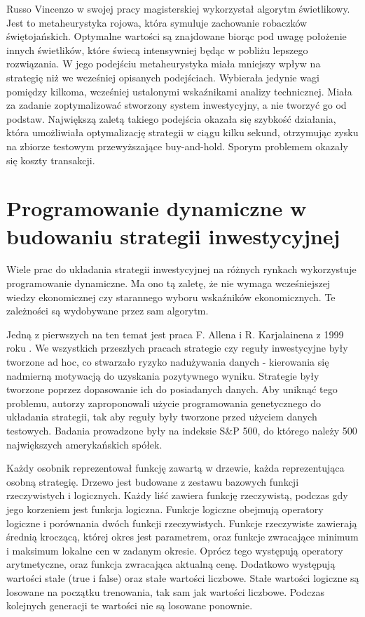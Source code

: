 \documentclass[twoside]{iisthesis}
\begin{document}
Russo Vincenzo w swojej pracy magisterskiej \cite{Russo:2015} wykorzystał algorytm świetlikowy. Jest to metaheurystyka rojowa, która symuluje zachowanie robaczków świętojańskich. Optymalne wartości są znajdowane biorąc pod uwagę położenie innych świetlików, które świecą intensywniej będąc w pobliżu lepszego rozwiązania. W jego podejściu metaheurystyka miała mniejszy wpływ na strategię niż we wcześniej opisanych podejściach. Wybierała jedynie wagi pomiędzy kilkoma, wcześniej ustalonymi wskaźnikami analizy technicznej. Miała za zadanie zoptymalizować stworzony system inwestycyjny, a nie tworzyć go od podstaw. Największą zaletą takiego podejścia okazała się szybkość działania, która umożliwiała optymalizację strategii w ciągu kilku sekund, otrzymując zysku na zbiorze testowym przewyższające buy-and-hold. Sporym problemem okazały się koszty transakcji.





\section{Programowanie dynamiczne w budowaniu strategii inwestycyjnej}

Wiele prac do układania strategii inwestycyjnej na różnych rynkach wykorzystuje programowanie dynamiczne. Ma ono tą zaletę, że nie wymaga wcześniejszej wiedzy ekonomicznej czy starannego wyboru wskaźników ekonomicznych. Te zależności są wydobywane przez sam algorytm. 

Jedną z pierwszych na ten temat jest praca F. Allena i R. Karjalainena z 1999 roku \cite{Allen1999245}. We wszystkich przeszłych pracach strategie czy reguły inwestycyjne były tworzone ad hoc, co stwarzało ryzyko nadużywania danych - kierowania się nadmierną motywacją do uzyskania pozytywnego wyniku. Strategie były tworzone poprzez dopasowanie ich do posiadanych danych. Aby uniknąć tego problemu, autorzy zaproponowali użycie programowania genetycznego do układania strategii, tak aby reguły były tworzone przed użyciem danych testowych. Badania prowadzone były na indeksie S\&P 500, do którego należy 500 największych amerykańskich spółek. 

Każdy osobnik reprezentował funkcję zawartą w drzewie, każda reprezentująca osobną strategię. Drzewo jest budowane z zestawu bazowych funkcji rzeczywistych i logicznych. Każdy liść zawiera funkcję rzeczywistą, podczas gdy jego korzeniem jest funkcja logiczna. Funkcje logiczne obejmują operatory logiczne i porównania dwóch funkcji rzeczywistych. Funkcje rzeczywiste zawierają średnią kroczącą, której okres jest parametrem, oraz funkcje zwracające minimum i maksimum lokalne cen w zadanym okresie. Oprócz tego występują operatory arytmetyczne, oraz funkcja zwracająca aktualną cenę. Dodatkowo występują wartości stałe (true i false) oraz stałe wartości liczbowe. Stałe wartości logiczne są losowane na początku trenowania, tak sam jak wartości liczbowe. Podczas kolejnych generacji te wartości nie są losowane ponownie.
\end{document}
